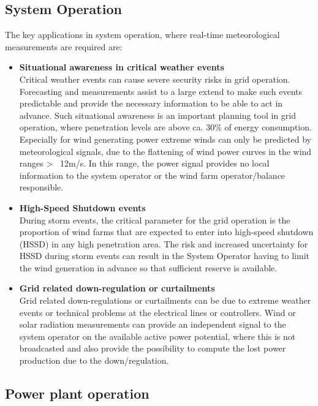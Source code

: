 \subsection{System Operation}

The key applications in system operation, where real-time meteorological measurements are required are: 

\begin{itemize}
    \item \textbf{Situational awareness in critical weather events}\\
    Critical weather events can cause severe security risks in grid operation. Forecasting and measurements assist to a large extend to make such events predictable and provide the necessary information to be able to act in advance. Such situational awareness is an important planning tool in grid operation, where penetration levels are above ca. 30\% of energy consumption.  Especially for wind generating power extreme winds can only be predicted by meteorological signals, due to the flattening of wind power curves in the wind ranges > ~12m/s. In this range, the power signal provides no local information to the system operator or the wind farm operator/balance responsible. 

    \item \textbf{High-Speed Shutdown events}\\
    During storm events, the critical parameter for the grid operation is the proportion of wind farms that are expected to enter into high-speed shutdown (HSSD) in any high penetration area. The risk and increased uncertainty for HSSD during storm events can result in the System Operator having to limit the wind generation in advance so that sufficient reserve is available.

    \item \textbf{Grid related down-regulation or curtailments}\\
    Grid related down-regulations or curtailments can be due to extreme weather events or technical problems at the electrical lines or controllers. Wind or solar radiation measurements can provide an independent signal to the system operator on the available active power potential, where this is not broadcasted and also provide the possibility to compute the lost power production due to the down/regulation. 
\end{itemize}


\subsection{Power plant operation {\color{blue}{Contributing author: IW/AC ?}}}

